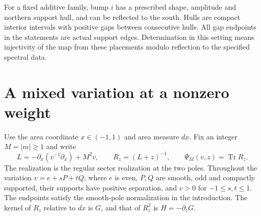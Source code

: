 \documentclass[11pt,letterpaper]{article}
\begin{document}
For a fixed additive family, bump \(i\) has a prescribed shape, amplitude
and northern support hull, and can be reflected to the south. Hulls are
compact interior intervals with positive gaps between consecutive hulls.
All gap endpoints in the statements are actual support edges.
Determination in this setting means injectivity of the map from these
placements modulo reflection to the specified spectral data.

\section{A mixed variation at a nonzero weight}

Use the area coordinate \(x\in(-1,1)\) and area measure \(dx\). Fix an
integer \(M=|m|\geq 1\) and write
\[
 L=-\partial_x(v^{-1}\partial_x)+M^2v,\qquad
 R_z=(L+z)^{-1},\qquad \Psi_M(v,z)=\operatorname{Tr}R_z .
\]
The realization is the regular sector realization at the two poles.
Throughout the variation \(v=e+sP+tQ\), where \(e\) is even, \(P,Q\)
are smooth, odd and compactly supported, their supports have positive
separation, and \(v>0\) for \(-1\leq s,t\leq1\). The endpoints satisfy the
smooth-pole normalization in the introduction. The kernel of \(R_z\)
relative to \(dx\) is \(G\), and that of \(R_z^2\) is \(H=-\partial_zG\).
\end{document}
